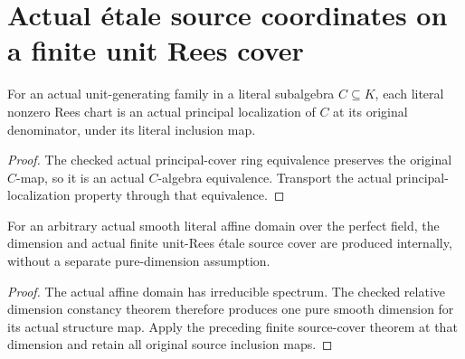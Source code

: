 \section{Actual \'etale source coordinates on a finite unit Rees cover}

\begin{lemma}\label{lem:sc0-unit-rees-isLocalization}
\leanok
{}
For an actual unit-generating family in a literal subalgebra $C\subseteq K$,
each literal nonzero Rees chart is an actual principal localization of $C$
at its original denominator, under its literal inclusion map.
\end{lemma}
\begin{proof}
The checked actual principal-cover ring equivalence preserves the original
$C$-map, so it is an actual $C$-algebra equivalence. Transport the actual
principal-localization property through that equivalence.
\end{proof}

\begin{corollary}\label{cor:sc0-smooth-source-unit-rees-etale-cover}
\leanok
{}
For an arbitrary actual smooth literal affine domain over the perfect field,
the dimension and actual finite unit-Rees \'etale source cover are produced
internally, without a separate pure-dimension assumption.
\end{corollary}
\begin{proof}
The actual affine domain has irreducible spectrum. The checked relative
dimension constancy theorem therefore produces one pure smooth dimension
for its actual structure map. Apply the preceding finite source-cover theorem
at that dimension and retain all original source inclusion maps.
\end{proof}

